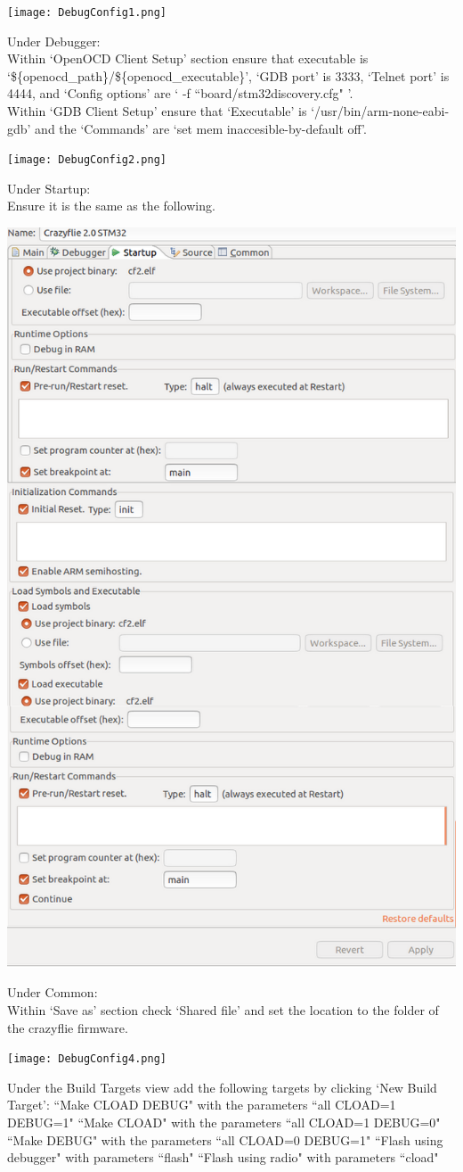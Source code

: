 \documentclass[]{article}
\begin{document}
\texttt{[image: DebugConfig1.png]}

Under Debugger: \\
Within `OpenOCD Client Setup' section ensure that executable is `\$\{openocd\_path\}/\$\{openocd\_executable\}', `GDB port' is 3333, `Telnet port' is 4444, and `Config options' are ` -f ``board/stm32discovery.cfg" '. \\
Within `GDB Client Setup' ensure that `Executable' is `/usr/bin/arm-none-eabi-gdb' and the `Commands' are `set mem inaccesible-by-default off'.

\texttt{[image: DebugConfig2.png]}

Under Startup: \\
Ensure it is the same as the following.

\includegraphics[width=0.55\linewidth]{DebugConfig3.png}

\newpage

Under Common: \\
Within `Save as' section check `Shared file' and set the location to the folder of the crazyflie firmware.

\texttt{[image: DebugConfig4.png]}

Under the Build Targets view add the following targets by clicking `New Build Target':
``Make CLOAD DEBUG" with the parameters ``all CLOAD=1 DEBUG=1"
``Make CLOAD" with the parameters ``all CLOAD=1 DEBUG=0"
``Make DEBUG" with the parameters ``all CLOAD=0 DEBUG=1"
``Flash using debugger" with parameters ``flash"
``Flash using radio" with parameters ``cload"
\end{document}
